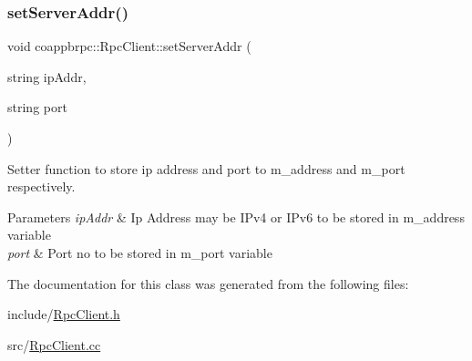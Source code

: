 \subsubsection{\texorpdfstring{set\+Server\+Addr()}{setServerAddr()}}
{\footnotesize\ttfamily void coappbrpc\+::\+Rpc\+Client\+::set\+Server\+Addr (\begin{DoxyParamCaption}\item[{string}]{ip\+Addr,  }\item[{string}]{port }\end{DoxyParamCaption})}



Setter function to store ip address and port to m\+\_\+address and m\+\_\+port respectively. 


\begin{DoxyParams}{Parameters}
{\em ip\+Addr} & Ip Address may be I\+Pv4 or I\+Pv6 to be stored in m\+\_\+address variable \\
\hline
{\em port} & Port no to be stored in m\+\_\+port variable \\
\hline
\end{DoxyParams}


The documentation for this class was generated from the following files\+:\begin{DoxyCompactItemize}
\item 
include/\hyperlink{RpcClient_8h}{Rpc\+Client.\+h}\item 
src/\hyperlink{RpcClient_8cc}{Rpc\+Client.\+cc}\end{DoxyCompactItemize}
